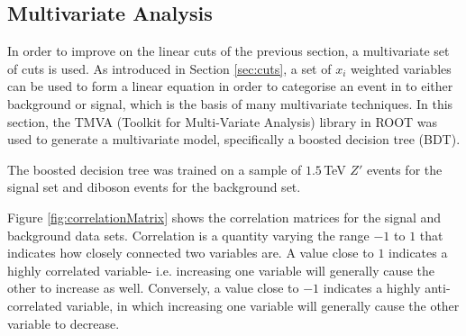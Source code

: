 \documentclass{article}
\begin{document}
\subsection{Multivariate Analysis}
\label{sec:MCA_MVA}

In order to improve on the linear cuts of the previous section, a multivariate set of cuts is used. As introduced in Section \ref{sec:cuts},  a set of $x_i$ weighted variables can be used to form a linear equation in order to categorise an event in to either background or signal, which is the basis of many multivariate techniques. In this section, the TMVA (Toolkit for Multi-Variate Analysis) library in ROOT was used to generate a multivariate model, specifically a boosted decision tree (BDT).

The boosted decision tree was trained on a sample of $1.5\,$TeV $Z'$ events for the signal set and diboson events for the background set.

Figure \ref{fig:correlationMatrix} shows the correlation matrices for the signal and background data sets. Correlation is a quantity varying the range $-1$ to $1$ that indicates how closely connected two variables are. A value close to $1$ indicates a highly correlated variable- i.e. increasing one variable will generally cause the other to increase as well. Conversely, a value close to $-1$ indicates a highly anti-correlated variable, in which increasing one variable will generally cause the other variable to decrease.
\end{document}
